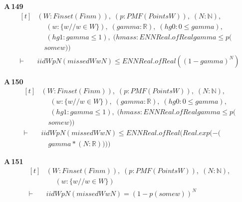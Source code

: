 \noindent\textbf{A\,149}\quad{}
{\footnotesize\[ \begin{aligned}[t]
&(\mathit{W} : \mathit{Finset} (\mathit{Fin} \mathit{m})),\; (\mathit{p} : \mathit{PMF} (\mathit{Points} \mathit{W})),\; (\mathit{N} : \mathbb{N} ),\\
&\quad \; (\mathit{w} : \{ \mathit{w} // \mathit{w} \in \mathit{W}\} ),\; (\mathit{gamma} : \mathbb{R} ),\; (\mathit{hg0} : 0 \leq \mathit{gamma}),\\
&\quad \; (\mathit{hg1} : \mathit{gamma} \leq 1),\; (\mathit{hmass} : \mathit{ENNReal}.\mathit{ofReal} \mathit{gamma} \leq \mathit{p} (\\
&\quad \mathit{some} \mathit{w}))\\
\vdash\;&\mathit{iid} \mathit{W} \mathit{p} \mathit{N} (\mathit{missed} \mathit{W} \mathit{w} \mathit{N}) \leq \mathit{ENNReal}.\mathit{ofReal} ((1-\mathit{gamma})^{\mathit{N}})
\end{aligned} \]}

\noindent\textbf{A\,150}\quad{}
{\footnotesize\[ \begin{aligned}[t]
&(\mathit{W} : \mathit{Finset} (\mathit{Fin} \mathit{m})),\; (\mathit{p} : \mathit{PMF} (\mathit{Points} \mathit{W})),\; (\mathit{N} : \mathbb{N} ),\\
&\quad \; (\mathit{w} : \{ \mathit{w} // \mathit{w} \in \mathit{W}\} ),\; (\mathit{gamma} : \mathbb{R} ),\; (\mathit{hg0} : 0 \leq \mathit{gamma}),\\
&\quad \; (\mathit{hg1} : \mathit{gamma} \leq 1),\; (\mathit{hmass} : \mathit{ENNReal}.\mathit{ofReal} \mathit{gamma} \leq \mathit{p} (\\
&\quad \mathit{some} \mathit{w}))\\
\vdash\;&\mathit{iid} \mathit{W} \mathit{p} \mathit{N} (\mathit{missed} \mathit{W} \mathit{w} \mathit{N}) \leq \mathit{ENNReal}.\mathit{ofReal} (\mathit{Real}.\mathit{exp} (-(\\
&\quad \mathit{gamma}*(\mathit{N}:\mathbb{R} ))))
\end{aligned} \]}

\noindent\textbf{A\,151}\quad{}
{\footnotesize\[ \begin{aligned}[t]
&(\mathit{W} : \mathit{Finset} (\mathit{Fin} \mathit{m})),\; (\mathit{p} : \mathit{PMF} (\mathit{Points} \mathit{W})),\; (\mathit{N} : \mathbb{N} ),\\
&\quad \; (\mathit{w} : \{ \mathit{w} // \mathit{w} \in \mathit{W}\} )\\
\vdash\;&\mathit{iid} \mathit{W} \mathit{p} \mathit{N} (\mathit{missed} \mathit{W} \mathit{w} \mathit{N}) = (1 - \mathit{p} (\mathit{some} \mathit{w}))^{\mathit{N}}
\end{aligned} \]}

